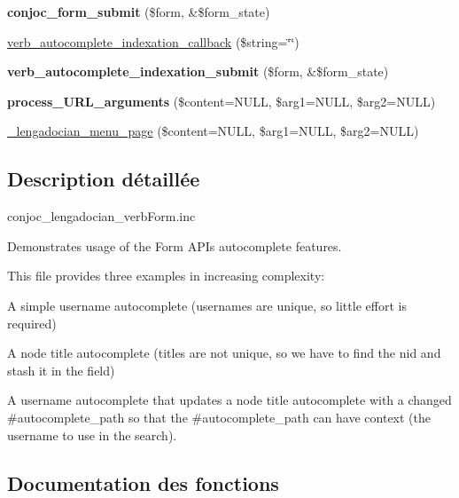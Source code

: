\begin{DoxyCompactItemize}
\hypertarget{conjoc__lengadocian__webForm_8inc_ad10d751f3d75ba568eb1f41bd43fcc94}{}\label{conjoc__lengadocian__webForm_8inc_ad10d751f3d75ba568eb1f41bd43fcc94} 
{\bfseries conjoc\+\_\+form\+\_\+submit} (\$form, \&\$form\+\_\+state)
\item 
\hyperlink{conjoc__lengadocian__webForm_8inc_a378d4601a46c698692d26cb301470598}{verb\+\_\+autocomplete\+\_\+indexation\+\_\+callback} (\$string=\char`\"{}\char`\"{})
\item 
\hypertarget{conjoc__lengadocian__webForm_8inc_a5e7b0be9cab73b5b2be66499afd0edc5}{}\label{conjoc__lengadocian__webForm_8inc_a5e7b0be9cab73b5b2be66499afd0edc5} 
{\bfseries verb\+\_\+autocomplete\+\_\+indexation\+\_\+submit} (\$form, \&\$form\+\_\+state)
\item 
\hypertarget{conjoc__lengadocian__webForm_8inc_afecc813b5558b906fe6cc9adb1419c35}{}\label{conjoc__lengadocian__webForm_8inc_afecc813b5558b906fe6cc9adb1419c35} 
{\bfseries process\+\_\+\+U\+R\+L\+\_\+arguments} (\$content=N\+U\+LL, \$arg1=N\+U\+LL, \$arg2=N\+U\+LL)
\item 
\hyperlink{conjoc__lengadocian__webForm_8inc_a4ffe99e612db8d794975a33aefb781f7}{\+\_\+lengadocian\+\_\+menu\+\_\+page} (\$content=N\+U\+LL, \$arg1=N\+U\+LL, \$arg2=N\+U\+LL)
\end{DoxyCompactItemize}


\subsection{Description détaillée}
conjoc\+\_\+lengadocian\+\_\+verb\+Form.\+inc

Demonstrates usage of the Form A\+PI\textquotesingle{}s autocomplete features.

This file provides three examples in increasing complexity\+:
\begin{DoxyItemize}
\item A simple username autocomplete (usernames are unique, so little effort is required)
\item A node title autocomplete (titles are not unique, so we have to find the nid and stash it in the field)
\item A username autocomplete that updates a node title autocomplete with a changed \#autocomplete\+\_\+path so that the \#autocomplete\+\_\+path can have context (the username to use in the search). 
\end{DoxyItemize}

\subsection{Documentation des fonctions}
\hypertarget{conjoc__lengadocian__webForm_8inc_a4ffe99e612db8d794975a33aefb781f7}{}\label{conjoc__lengadocian__webForm_8inc_a4ffe99e612db8d794975a33aefb781f7} 
